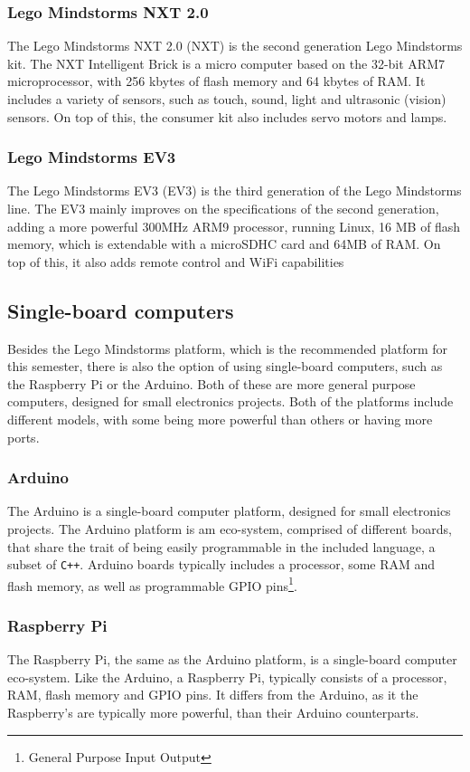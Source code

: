 \subsubsection{Lego Mindstorms NXT 2.0}
The Lego Mindstorms NXT 2.0 (NXT) is the second generation Lego Mindstorms kit.
The NXT Intelligent Brick is a micro computer based on the 32-bit ARM7 microprocessor, with 256 kbytes of flash memory and 64 kbytes of RAM\cite{nxt2userguide}.
It includes a variety of sensors, such as touch, sound, light and ultrasonic (vision) sensors.
On top of this, the consumer kit also includes servo motors and lamps.

\subsubsection{Lego Mindstorms EV3}
The  Lego Mindstorms EV3 (EV3) is the third generation of the Lego Mindstorms line.
The EV3 mainly improves on the specifications of the second generation, adding a more powerful 300MHz ARM9 processor, running Linux, 16 MB of flash memory, which is extendable with a microSDHC card and 64MB of RAM\cite{ev3userguide}.
On top of this, it also adds remote control and WiFi capabilities

\subsection{Single-board computers}
Besides the Lego Mindstorms platform, which is the recommended platform for this semester, there is also the option of using single-board computers, such as the Raspberry Pi or the Arduino.
Both of these are more general purpose computers, designed for small electronics projects.
Both of the platforms include different models, with some being more powerful than others or having more ports.

\subsubsection{Arduino}
The Arduino is a single-board computer platform, designed for small electronics projects.
The Arduino platform is am eco-system, comprised of different boards, that share the trait of being easily programmable in the included language, a subset of \texttt{C++}.
Arduino boards typically includes a processor, some RAM and flash memory, as well as programmable GPIO pins\footnote{General Purpose Input Output}.

\subsubsection{Raspberry Pi}
The Raspberry Pi, the same as the Arduino platform, is a single-board computer eco-system.
Like the Arduino, a Raspberry Pi, typically consists of a processor, RAM, flash memory and GPIO pins.
It differs from the Arduino, as it the Raspberry's are typically more powerful, than their Arduino counterparts.


